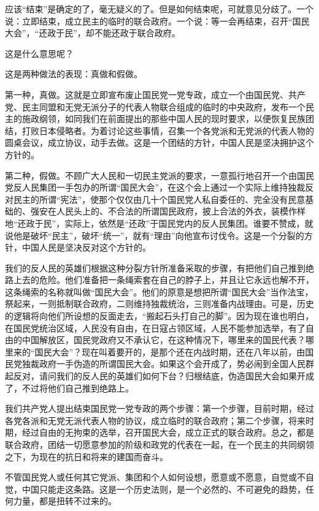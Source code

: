 应该“结束”是确定的了，毫无疑义的了。但是如何结束呢，可就意见分歧了。一个说：立即结束，成立民主的临时的联合政府。一个说：等一会再结束，召开“国民大会”，“还政于民”，却不能还政于联合政府。

这是什么意思呢？

这是两种做法的表现：真做和假做。

第一种，真做。这就是立即宣布废止国民党一党专政，成立一个由国民党、共产党、民主同盟和无党无派分子的代表人物联合组成的临时的中央政府，发布一个民主的施政纲领，如同我们在前面提出的那些中国人民的现时要求，以便恢复民族团结，打败日本侵略者。为着讨论这些事情，召集一个各党派和无党派的代表人物的圆桌会议，成立协议，动手去做。这是一个团结的方针，中国人民是坚决拥护这个方针的。

第二种，假做。不顾广大人民和一切民主党派的要求，一意孤行地召开一个由国民党反人民集团一手包办的所谓“国民大会”，在这个会上通过一个实际上维持独裁反对民主的所谓“宪法”，使那个仅仅由几十个国民党人私自委任的、完全没有民意基础的、强安在人民头上的、不合法的所谓国民政府，披上合法的外衣，装模作样地“还政于民”，实际上，依然是“还政”于国民党内的反人民集团。谁要不赞成，就说他是破坏“民主”，破坏“统一”，就有“理由”向他宣布讨伐令。这是一个分裂的方针，中国人民是坚决反对这个方针的。

我们的反人民的英雄们根据这种分裂方针所准备采取的步骤，有把他们自己推到绝路上去的危险。他们准备把一条绳索套在自己的脖子上，并且让它永远也解不开，这条绳索的名称就叫做“国民大会”。他们的原意是想把所谓“国民大会”当作法宝，祭起来，一则抵制联合政府，二则维持独裁统治，三则准备内战理由。可是，历史的逻辑将向他们所设想的反面走去，“搬起石头打自己的脚”。因为现在谁也明白，在国民党统治区域，人民没有自由，在日寇占领区域，人民不能参加选举，有了自由的中国解放区，国民党政府又不承认它，在这种情况下，哪里来的国民代表？哪里来的“国民大会”？现在叫着要开的，是那个还在内战时期，还在八年以前，由国民党独裁政府一手伪造的所谓国民大会。如果这个会开成了，势必闹到全国人民群起反对，请问我们的反人民的英雄们如何下台？归根结底，伪造国民大会如果开成了，不过将他们自己推到绝路上。

我们共产党人提出结束国民党一党专政的两个步骤：第一个步骤，目前时期，经过各党各派和无党无派代表人物的协议，成立临时的联合政府；第二个步骤，将来时期，经过自由的无拘束的选举，召开国民大会，成立正式的联合政府。总之，都是联合政府，团结一切愿意参加的阶级和政党的代表在一起，在一个民主的共同纲领之下，为现在的抗日和将来的建国而奋斗。

不管国民党人或任何其它党派、集团和个人如何设想，愿意或不愿意，自觉或不自觉，中国只能走这条路。这是一个历史法则，是一个必然的、不可避免的趋势，任何力量，都是扭转不过来的。

